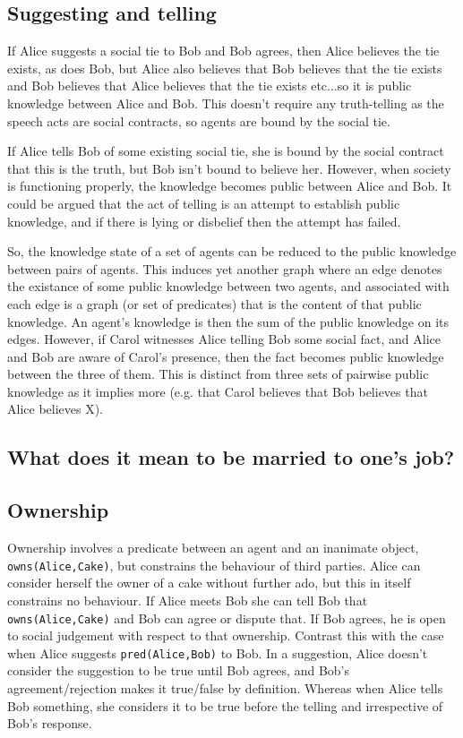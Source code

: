 \documentclass[a4paper]{article}
\begin{document}
\subsection{Suggesting and telling}

If Alice suggests a social tie to Bob and Bob agrees, then Alice believes the tie exists, as does Bob, but Alice also believes that Bob believes that the tie exists and Bob believes that Alice believes that the tie exists etc...so it is public knowledge between Alice and Bob. This doesn't require any truth-telling as the speech acts are social contracts, so agents are bound by the social tie.

If Alice tells Bob of some existing social tie, she is bound by the social contract that this is the truth, but Bob isn't bound to believe her. However, when society is functioning properly, the knowledge becomes public between Alice and Bob. It could be argued that the act of telling is an attempt to establish public knowledge, and if there is lying or disbelief then the attempt has failed.

So, the knowledge state of a set of agents can be reduced to the public knowledge between pairs of agents. This induces yet another graph where an edge denotes the existance of some public knowledge between two agents, and associated with each edge is a graph (or set of predicates) that is the content of that public knowledge. An agent's knowledge is then the sum of the public knowledge on its edges. However, if Carol witnesses Alice telling Bob some social fact, and Alice and Bob are aware of Carol's presence, then the fact becomes public knowledge between the three of them. This is distinct from three sets of pairwise public knowledge as it implies more (e.g. that Carol believes that Bob believes that Alice believes X). 


\subsection{What does it mean to be married to one's job?}


\subsection{Ownership}

Ownership involves a predicate between an agent and an inanimate object, \texttt{owns(Alice,Cake)}, but constrains the behaviour of third parties. Alice can consider herself the owner of a cake without further ado, but this in itself constrains no behaviour. If Alice meets Bob she can tell Bob that \texttt{owns(Alice,Cake)} and Bob can agree or dispute that. If Bob agrees, he is open to social judgement with respect to that ownership. Contrast this with the case when Alice suggests \texttt{pred(Alice,Bob)} to Bob. In a suggestion, Alice doesn't consider the suggestion to be true until Bob agrees, and Bob's agreement/rejection makes it true/false by definition. Whereas when Alice tells Bob something, she considers it to be true before the telling and irrespective of Bob's response.
\end{document}
